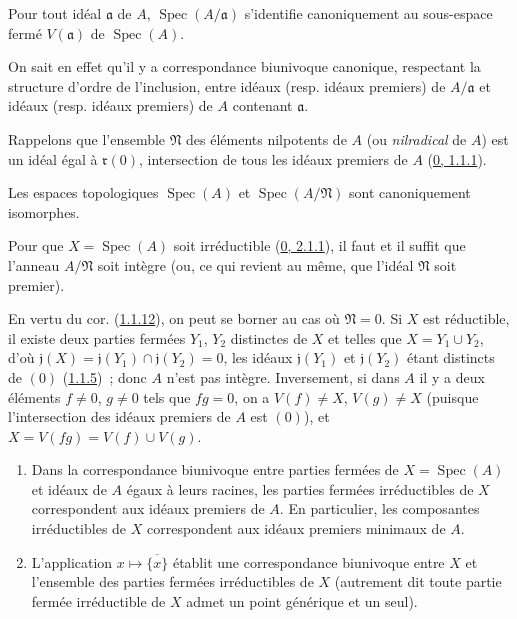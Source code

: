 \begin{proposition}[1.1.11]
\label{I.1.1.11-fr}
Pour tout idéal $\mathfrak{a}$ de $A$,
$\operatorname{Spec}(A/\mathfrak{a})$ s'identifie canoniquement au sous-espace
fermé $V(\mathfrak{a})$ de $\operatorname{Spec}(A)$.
\end{proposition}

On sait en effet qu'il y a correspondance biunivoque canonique, respectant la
structure d'ordre de l'inclusion, entre idéaux (resp. idéaux premiers) de
$A/\mathfrak{a}$ et idéaux (resp. idéaux premiers) de $A$ contenant
$\mathfrak{a}$.

Rappelons que l'ensemble $\mathfrak{N}$ des éléments nilpotents de $A$ (ou
\emph{nilradical} de $A$) est un idéal égal à $\mathfrak{r}(0)$, intersection
de tous les idéaux premiers de $A$
(\hyperref[0.1.1.1-fr]{0, 1.1.1}).

\begin{corollary}[1.1.12]
\label{I.1.1.12-fr}
Les espaces topologiques $\operatorname{Spec}(A)$ et
$\operatorname{Spec}(A/\mathfrak{N})$ sont canoniquement isomorphes.
\end{corollary}

\begin{proposition}[1.1.13]
\label{I.1.1.13-fr}
Pour que $X=\operatorname{Spec}(A)$ soit irréductible
(\hyperref[0.2.1.1-fr]{0, 2.1.1}), il faut et il suffit que l'anneau
$A/\mathfrak{N}$ soit intègre (ou, ce qui revient au même, que l'idéal
$\mathfrak{N}$ soit premier).
\end{proposition}

En vertu du cor. (\hyperref[I.1.1.12-fr]{1.1.12}), on peut se borner au cas où
$\mathfrak{N}=0$. Si $X$ est réductible, il existe deux parties fermées
$Y_1$, $Y_2$ distinctes de $X$ et telles que $X=Y_1\cup Y_2$, d'où
$\mathfrak{j}(X)=\mathfrak{j}(Y_1)\cap\mathfrak{j}(Y_2)=0$, les idéaux
$\mathfrak{j}(Y_1)$ et $\mathfrak{j}(Y_2)$ étant distincts de $(0)$
(\hyperref[I.1.1.5-fr]{1.1.5})~; donc $A$ n'est pas intègre. Inversement, si
dans $A$ il y a deux éléments $f\neq0$, $g\neq0$ tels que $fg=0$, on a
$V(f)\neq X$, $V(g)\neq X$ (puisque l'intersection des idéaux premiers de
$A$ est $(0)$), et $X=V(fg)=V(f)\cup V(g)$.

\begin{corollary}[1.1.14]
\label{I.1.1.14-fr}
\begin{enumerate}
  \item[\rm(i)] Dans la correspondance biunivoque entre parties fermées de
  $X=\operatorname{Spec}(A)$ et idéaux de $A$ égaux à leurs racines, les
  parties fermées irréductibles de $X$ correspondent aux idéaux premiers de
  $A$. En particulier, les composantes irréductibles de $X$ correspondent aux
  idéaux premiers minimaux de $A$.
  \item[\rm(ii)] L'application $x\mapsto\overline{\{x\}}$ établit une
  correspondance biunivoque entre $X$ et l'ensemble des parties fermées
  irréductibles de $X$ (autrement dit toute partie fermée irréductible de $X$
  admet un point générique et un seul).
\end{enumerate}
\end{corollary}

